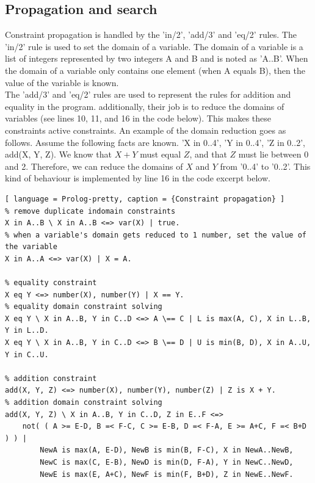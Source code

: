 \documentclass{report}
\begin{document}
\subsection{Propagation and search}
Constraint propagation is handled by the 'in/2', 'add/3' and 'eq/2' rules. The 'in/2' rule is used to set the domain of a variable. The domain of a variable is a list of integers represented by two integers A and B and is noted as 'A..B'. When the domain of a variable only contains one element (when A equals B), then the value of the variable is known. \\
The 'add/3' and 'eq/2' rules are used to represent the rules for addition and equality in the program. additionally, their job is to reduce the domains of variables (see lines 10, 11, and 16 in the code below). This makes these constraints active constraints. An example of the domain reduction goes as follows. Assume the following facts are known. 'X in 0..4', 'Y in 0..4', 'Z in 0..2', add(X, Y, Z). We know that \(X + Y\) must equal \(Z\), and that \(Z\) must lie between 0 and 2. Therefore, we can reduce the domains of \(X\) and \(Y\) from '0..4' to '0..2'. This kind of behaviour is implemented by line 16 in the code excerpt below.
\begin{lstlisting}[ language = Prolog-pretty, caption = {Constraint propagation} ]
% remove duplicate indomain constraints
X in A..B \ X in A..B <=> var(X) | true.
% when a variable's domain gets reduced to 1 number, set the value of the variable
X in A..A <=> var(X) | X = A.

% equality constraint
X eq Y <=> number(X), number(Y) | X == Y.
% equality domain constraint solving
X eq Y \ X in A..B, Y in C..D <=> A \== C | L is max(A, C), X in L..B, Y in L..D.
X eq Y \ X in A..B, Y in C..D <=> B \== D | U is min(B, D), X in A..U, Y in C..U.

% addition constraint
add(X, Y, Z) <=> number(X), number(Y), number(Z) | Z is X + Y.
% addition domain constraint solving
add(X, Y, Z) \ X in A..B, Y in C..D, Z in E..F <=>
    not( ( A >= E-D, B =< F-C, C >= E-B, D =< F-A, E >= A+C, F =< B+D ) ) |
        NewA is max(A, E-D), NewB is min(B, F-C), X in NewA..NewB,
        NewC is max(C, E-B), NewD is min(D, F-A), Y in NewC..NewD,
        NewE is max(E, A+C), NewF is min(F, B+D), Z in NewE..NewF.
\end{lstlisting}
\end{document}
